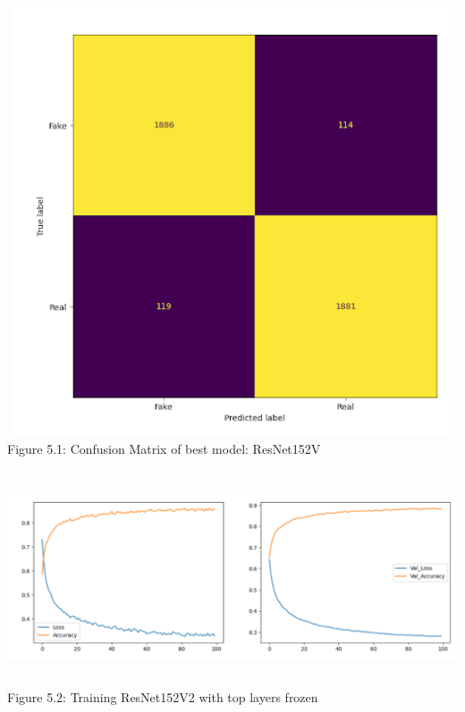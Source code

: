 \begin{center}
   \includegraphics[width=6in, height=5in]{images/5.1.png} 
   \\\fontsize{11pt}{24pt} Figure 5.1: Confusion Matrix of best model: ResNet152V
\end{center}

	
\begin{center}
   \includegraphics[width=6in, height=2.5in]{images/5.2.png} 
   \\\fontsize{11pt}{24pt} Figure 5.2: Training ResNet152V2 with top layers frozen
\end{center}

